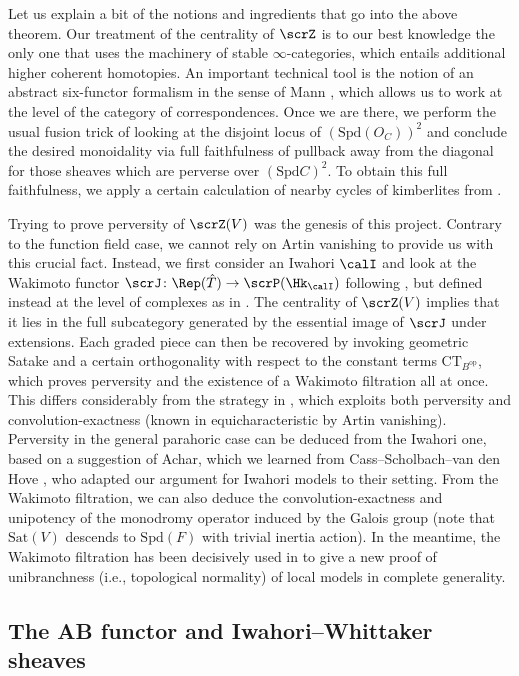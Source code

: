 \documentclass[10pt, reqno]{amsart}
\theoremstyle{plain}
\theoremstyle{definition}
\numberwithin{equation}{section}
\begin{document}
	Let us explain a bit of the notions and ingredients that go into the above theorem. Our treatment of the centrality of $\scrZ$ is to our best knowledge the only one that uses the machinery of stable $\infty$-categories, which entails additional higher coherent homotopies. An important technical tool is the notion of an abstract six-functor formalism in the sense of Mann \cite{Man22,Man22b}, which allows us to work at the level of the category of correspondences. Once we are there, we perform the usual fusion trick of looking at the disjoint locus of $(\mathrm{Spd}(O_C))^2$ and conclude the desired monoidality via full faithfulness of pullback away from the diagonal for those sheaves which are perverse over $(\mathrm{Spd}C)^2$. To obtain this full faithfulness, we apply a certain calculation of nearby cycles of kimberlites from \cite{GL24}.
	
	Trying to prove perversity of $\scrZ(V)$ was the genesis of this project. Contrary to the function field case, we cannot rely on Artin vanishing to provide us with this crucial fact. Instead, we first consider an Iwahori $\calI$ and look at the Wakimoto functor $\scrJ\colon \Rep(\hat{T}) \to \scrP(\Hk_\calI)$ following \cite{AB09}, but defined instead at the level of complexes as in \cite{AR}. The centrality of $\scrZ(V)$ implies that it lies in the full subcategory generated by the essential image of $\scrJ$ under extensions. Each graded piece can then be recovered by invoking geometric Satake and a certain orthogonality with respect to the constant terms $\mathrm{CT}_{B^{\mathrm{op}}}$, which proves perversity and the existence of a Wakimoto filtration all at once. This differs considerably from the strategy in \cite{AB09}, which exploits both perversity and convolution-exactness (known in equicharacteristic by Artin vanishing). 
	Perversity in the general parahoric case can be deduced from the Iwahori one, based on a suggestion of Achar, which we learned from Cass--Scholbach--van den Hove \cite{CvdHS24}, who adapted our argument for Iwahori models to their setting. 
	From the Wakimoto filtration, we can also deduce the convolution-exactness and unipotency of the monodromy operator induced by the Galois group (note that $\mathrm{Sat}(V)$ descends to $\mathrm{Spd}(F)$ with trivial inertia action).
	In the meantime, the Wakimoto filtration has been decisively used in \cite{GL24} to give a new proof of unibranchness (i.e., topological normality) of local models in complete generality.
	
	\subsection{The AB functor and Iwahori--Whittaker sheaves}
	
\end{document}
